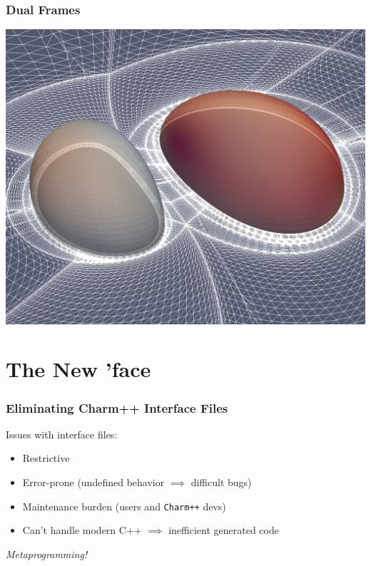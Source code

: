 \documentclass[svgnames,tikz,serif,ragged2e]{beamer}
\begin{document}
\begin{frame}
  \frametitle{Dual Frames}
  \vspace{-0.15cm}
  \begin{center}
    \includegraphics[height=.86\textheight]{PostUltimateGridPlusHorizons}
  \end{center}
\end{frame}

\section{The New 'face}

\begin{frame}
  \frametitle{Eliminating Charm++ Interface Files}
  Issues with interface files:
  \begin{itemize}
  \item Restrictive
  \item Error-prone (undefined behavior $\implies$ difficult bugs)
  \item Maintenance burden (users and \texttt{Charm++} devs)
  \item Can't handle modern C++ $\implies$ inefficient generated code
  \end{itemize}
  \vspace{1.0cm}

  \begin{center}
    \textit{Metaprogramming!}
  \end{center}
\end{frame}
\end{document}
